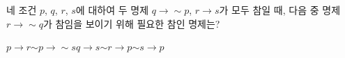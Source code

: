 네 조건 $p$, $q$, $r$, $s$에 대하여 두 명제 $q\longrightarrow \sim p$, $r\longrightarrow s$가 모두 참일 때, 다음 중 명제 $r\longrightarrow \sim q$가 참임을 보이기 위해 필요한 참인 명제는?
\begin{choices32}{$p\longrightarrow r$}{$\sim p\longrightarrow \sim s$}{$q\longrightarrow s$}{$\sim r\longrightarrow p$}{$\sim s\longrightarrow p$}\end{choices32}
